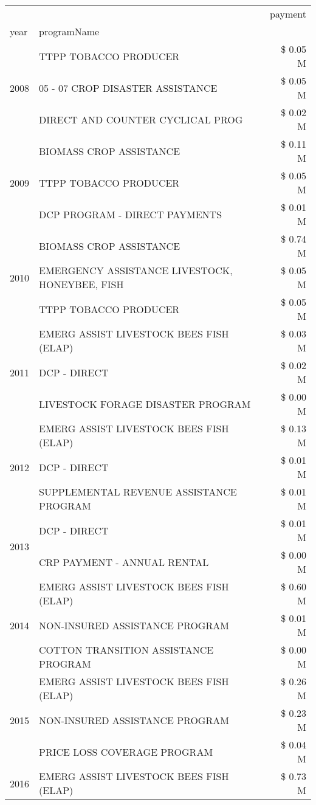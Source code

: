 \begin{tabular}{llr}
\toprule
 &  & payment \\
year & programName &  \\
\midrule
\multirow[t]{3}{*}{2008} & TTPP TOBACCO PRODUCER & \$ 0.05 M \\
 & 05 - 07 CROP DISASTER ASSISTANCE & \$ 0.05 M \\
 & DIRECT AND COUNTER CYCLICAL PROG & \$ 0.02 M \\
\cline{1-3}
\multirow[t]{3}{*}{2009} & BIOMASS CROP ASSISTANCE & \$ 0.11 M \\
 & TTPP TOBACCO PRODUCER & \$ 0.05 M \\
 & DCP PROGRAM - DIRECT PAYMENTS & \$ 0.01 M \\
\cline{1-3}
\multirow[t]{3}{*}{2010} & BIOMASS CROP ASSISTANCE & \$ 0.74 M \\
 & EMERGENCY ASSISTANCE LIVESTOCK, HONEYBEE, FISH & \$ 0.05 M \\
 & TTPP TOBACCO PRODUCER & \$ 0.05 M \\
\cline{1-3}
\multirow[t]{3}{*}{2011} & EMERG ASSIST LIVESTOCK BEES FISH (ELAP) & \$ 0.03 M \\
 & DCP - DIRECT & \$ 0.02 M \\
 & LIVESTOCK FORAGE DISASTER PROGRAM & \$ 0.00 M \\
\cline{1-3}
\multirow[t]{3}{*}{2012} & EMERG ASSIST LIVESTOCK BEES FISH (ELAP) & \$ 0.13 M \\
 & DCP - DIRECT & \$ 0.01 M \\
 & SUPPLEMENTAL REVENUE ASSISTANCE PROGRAM & \$ 0.01 M \\
\cline{1-3}
\multirow[t]{2}{*}{2013} & DCP - DIRECT & \$ 0.01 M \\
 & CRP PAYMENT - ANNUAL RENTAL & \$ 0.00 M \\
\cline{1-3}
\multirow[t]{3}{*}{2014} & EMERG ASSIST LIVESTOCK BEES FISH (ELAP) & \$ 0.60 M \\
 & NON-INSURED ASSISTANCE PROGRAM & \$ 0.01 M \\
 & COTTON TRANSITION ASSISTANCE PROGRAM & \$ 0.00 M \\
\cline{1-3}
\multirow[t]{3}{*}{2015} & EMERG ASSIST LIVESTOCK BEES FISH (ELAP) & \$ 0.26 M \\
 & NON-INSURED ASSISTANCE PROGRAM & \$ 0.23 M \\
 & PRICE LOSS COVERAGE PROGRAM & \$ 0.04 M \\
\cline{1-3}
\multirow[t]{3}{*}{2016} & EMERG ASSIST LIVESTOCK BEES FISH (ELAP)       & \$ 0.73 M \\

\end{tabular}
